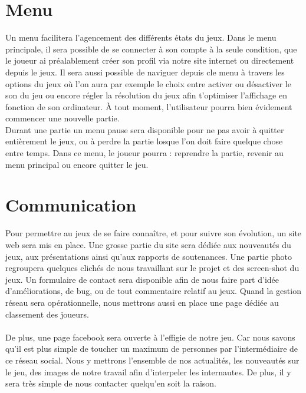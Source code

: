 \documentclass [11pt]{report}
\begin{document}
	




	\section {Menu}
		Un menu facilitera l'agencement des différents états du jeux. Dans le menu principale, il sera possible de se connecter à son compte à la seule condition, que le joueur ai préalablement créer son profil via notre site internet ou directement depuis le jeux. Il sera aussi possible de naviguer depuis cle menu à travers les options du jeux 		où l'on aura par exemple le choix entre activer ou désactiver le son du jeu ou encore régler la résolution du jeux afin t'optimiser l'affichage en fonction de son ordinateur. \`A tout moment, l'utilisateur pourra bien évidement commencer une nouvelle partie. \\
		\indent Durant une partie un menu pause sera disponible pour ne pas avoir à quitter entièrement le jeux, ou à perdre la partie losque l'on doit faire quelque chose entre temps. Dans ce menu, le joueur pourra : reprendre la partie, revenir au menu principal ou encore quitter le jeu.\\\vspace{5mm}


	\section {Communication}
		Pour permettre au jeux de se faire conna\^itre, et pour suivre son \'evolution, un site web sera mis en place. Une grosse partie du site sera dédiée aux nouveautés du jeux, aux présentations ainsi qu'aux rapports de soutenances. Une partie photo regroupera quelques clichés de nous travaillant sur le projet et des screen-shot du 		jeux. Un formulaire de contact sera disponible afin de nous faire part d'idée d'am\'eliorations, de bug, ou de tout commentaire relatif au jeux. Quand la gestion réseau sera opérationnelle, nous mettrons aussi en place une page dédiée au classement des joueurs.
	\\
	\\
	 \indent De plus, une page facebook sera ouverte à l'effigie de notre jeu. Car nous savons qu'il est plus simple de toucher un maximum de personnes par l'intermédiaire de ce réseau social. Nous y mettrons l'ensemble de nos actualités, les nouveautés sur le jeu, des images de notre travail afin d'interpeler les internautes. De plus, il y sera 		très simple de nous contacter quelqu'en soit la raison.\\\vspace{5mm}
\end{document}
